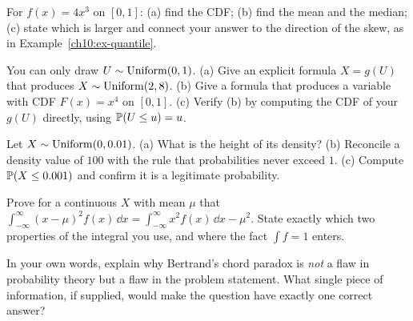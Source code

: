 \begin{exercise}
\label{ch10:exr-skew}
For $f(x)=4x^3$ on $[0,1]$: (a) find the CDF; (b) find the mean and the median;
(c) state which is larger and connect your answer to the direction of the skew, as
in Example~\ref{ch10:ex-quantile}.
\end{exercise}

\begin{exercise}
\label{ch10:exr-pit}
You can only draw $U \sim \Unif(0,1)$. (a) Give an explicit formula $X=g(U)$ that
produces $X \sim \Unif(2,8)$. (b) Give a formula that produces a variable with CDF
$F(x)=x^4$ on $[0,1]$. (c) Verify (b) by computing the CDF of your $g(U)$ directly,
using $\P(U\le u)=u$.
\end{exercise}

\begin{exercise}
\label{ch10:exr-bignum}
Let $X \sim \Unif(0, 0.01)$. (a) What is the height of its density? (b) Reconcile a
density value of $100$ with the rule that probabilities never exceed $1$.
(c) Compute $\P(X \le 0.001)$ and confirm it is a legitimate probability.
\end{exercise}

\begin{exercise}
\label{ch10:exr-varproof}
Prove for a continuous $X$ with mean $\mu$ that
$\int_{-\infty}^{\infty}(x-\mu)^2 f(x)\,\dd x = \int_{-\infty}^{\infty} x^2 f(x)\,\dd x
- \mu^2$. State exactly which two properties of the integral you use, and where the
fact $\int f = 1$ enters.
\end{exercise}

\begin{exercise}
\label{ch10:exr-bertrand}
In your own words, explain why Bertrand's chord paradox is \emph{not} a flaw in
probability theory but a flaw in the problem statement. What single piece of
information, if supplied, would make the question have exactly one correct answer?
\end{exercise}
